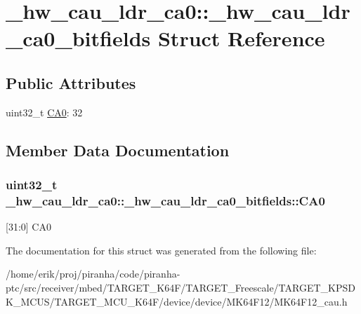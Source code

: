 \hypertarget{struct__hw__cau__ldr__ca0_1_1__hw__cau__ldr__ca0__bitfields}{}\section{\+\_\+hw\+\_\+cau\+\_\+ldr\+\_\+ca0\+:\+:\+\_\+hw\+\_\+cau\+\_\+ldr\+\_\+ca0\+\_\+bitfields Struct Reference}
\label{struct__hw__cau__ldr__ca0_1_1__hw__cau__ldr__ca0__bitfields}
\subsection*{Public Attributes}
\begin{DoxyCompactItemize}
\item 
uint32\+\_\+t \hyperlink{struct__hw__cau__ldr__ca0_1_1__hw__cau__ldr__ca0__bitfields_a03dd69276b84146a1857b40ab8586422}{C\+A0}\+: 32
\end{DoxyCompactItemize}


\subsection{Member Data Documentation}
\subsubsection[{\texorpdfstring{C\+A0}{CA0}}]{\setlength{\rightskip}{0pt plus 5cm}uint32\+\_\+t \+\_\+hw\+\_\+cau\+\_\+ldr\+\_\+ca0\+::\+\_\+hw\+\_\+cau\+\_\+ldr\+\_\+ca0\+\_\+bitfields\+::\+C\+A0}\hypertarget{struct__hw__cau__ldr__ca0_1_1__hw__cau__ldr__ca0__bitfields_a03dd69276b84146a1857b40ab8586422}{}\label{struct__hw__cau__ldr__ca0_1_1__hw__cau__ldr__ca0__bitfields_a03dd69276b84146a1857b40ab8586422}
\mbox{[}31\+:0\mbox{]} C\+A0 

The documentation for this struct was generated from the following file\+:\begin{DoxyCompactItemize}
\item 
/home/erik/proj/piranha/code/piranha-\/ptc/src/receiver/mbed/\+T\+A\+R\+G\+E\+T\+\_\+\+K64\+F/\+T\+A\+R\+G\+E\+T\+\_\+\+Freescale/\+T\+A\+R\+G\+E\+T\+\_\+\+K\+P\+S\+D\+K\+\_\+\+M\+C\+U\+S/\+T\+A\+R\+G\+E\+T\+\_\+\+M\+C\+U\+\_\+\+K64\+F/device/device/\+M\+K64\+F12/M\+K64\+F12\+\_\+cau.\+h\end{DoxyCompactItemize}

